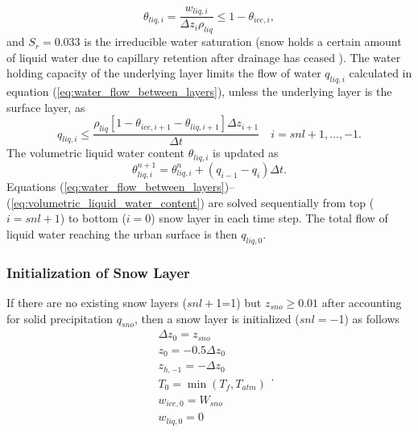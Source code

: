 \documentclass[12pt,authoryear]{elsarticle}
\numberwithin{equation}{section} %
\begin{document}
\begin{equation}
\theta_{liq,i}=\frac{w_{liq,i}}{\Delta z_{i}\rho_{liq}} \leq 1-\theta_{ice,i},
\end{equation}
and $S_{r}=$0.033 is the irreducible water saturation (snow holds a certain amount of liquid water due to capillary retention after drainage has ceased \citep{andersonPointEnergyMass1976}). The water holding capacity of the underlying layer limits the flow of water $q_{liq,i}$ calculated in equation (\ref{eq:water_flow_between_layers}), unless the underlying layer is the surface layer, as
\begin{equation}
q_{liq,i} \leq \frac{\rho_{liq}\left[1-\theta_{ice,i+1}-\theta_{liq,i+1}\right]\Delta z_{i+1}}{\Delta t} \quad i=snl+1,...,-1.
\end{equation}
The volumetric liquid water content $\theta_{liq,i}$ is updated as
\begin{equation}
\label{eq:volumetric_liquid_water_content}
\theta_{liq,i}^{n+1}=\theta_{liq,i}^{n}+(q_{i-1}-q_{i})\Delta t.
\end{equation}
Equations (\ref{eq:water_flow_between_layers})--(\ref{eq:volumetric_liquid_water_content}) are solved sequentially from top ($i=snl+1$) to bottom ($i=$0) snow layer in each time step. The total flow of liquid water reaching the urban surface is then $q_{liq,0}$.

\subsubsection{Initialization of Snow Layer}
\label{sec:initialization_snow_layer}
%
If there are no existing snow layers ($snl+$1=1) but $z_{sno}\geq0.01$ after accounting for solid precipitation $q_{sno}$, then a snow layer is initialized ($snl=-$1) as follows
\begin{equation}
\begin{aligned}
&\Delta z_{0}=z_{sno} \\
&z_{0}=-0.5\Delta z_{0} \\
&z_{h,-1}=-\Delta z_{0} \\
&T_{0}=\min(T_{f},T_{atm}) \\
&w_{ice,0}=W_{sno} \\
&w_{liq,0}=0
\end{aligned}.
\end{equation}

\end{document}
